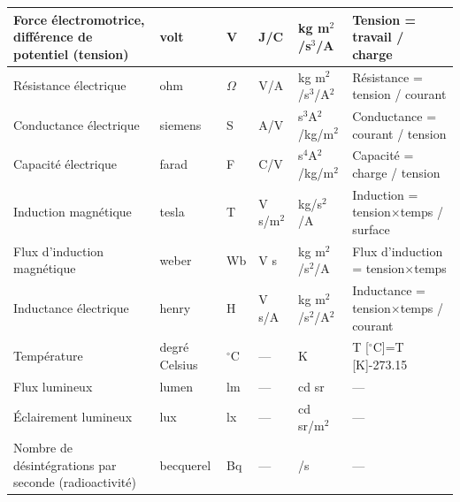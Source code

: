 \begin{center}
    \begin{tabular}[t]{>{\pbs\raggedright}p{28mm}
        >{\pbs\centering}p{17mm}
        >{\pbs\centering}p{11mm}
        >{\pbs\centering}p{22mm}
        >{\pbs\centering}p{22mm}
        >{\pbs\raggedright}p{32mm}}
        \hline
        Force électromotrice, différence de potentiel (tension) & volt          & V           & J/C       & kg m$^2$/s$^3$/A     & Tension = travail / charge
        \\ \hline
        Résistance électrique                                   & ohm           & $\Omega$    & V/A       & kg m$^2$/s$^3$/A$^2$ & Résistance =  tension / courant
        \\ \hline
        Conductance électrique                                  & siemens       & S           & A/V       & s$^3$A$^2$/kg/m$^2$  & Conductance = courant / tension
        \\ \hline
        Capacité électrique                                     & farad         & F           & C/V       & s$^4$A$^2$/kg/m$^2$  & Capacité = charge / tension
        \\ \hline
        Induction magnétique                                    & tesla         & T           & V s/m$^2$ & kg/s$^2$/A           & Induction = tension$\times$temps / surface
        \\ \hline
        Flux d'induction magnétique                             & weber         & Wb          & V s       & kg m$^2$/s$^2$/A     & Flux d'induction = tension$\times$temps
        \\ \hline
        Inductance électrique                                   & henry         & H           & V s/A     & kg m$^2$/s$^2$/A$^2$ & Inductance = tension$\times$temps / courant
        \\ \hline
        Température                                             & degré Celsius & $^{\circ}$C & ---       & K                    & T [$^{\circ}$C]=T [K]-273.15
        \\ \hline
        Flux lumineux                                           & lumen         & lm          & ---       & cd sr                & ---
        \\ \hline
        Éclairement lumineux                                    & lux           & lx          & ---       & cd sr/m$^2$          & ---
        \\ \hline
        Nombre de désintégrations par seconde (radioactivité)   & becquerel     & Bq          & ---       & 1/s                  & ---

\end{tabular}
\end{center}
